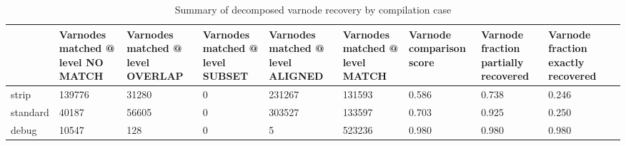 \begin{table}
\centering
\caption{Summary of decomposed varnode recovery by compilation case}
\label{table:opts-varnodes-summary-decomposed}
\begin{tabular}{lp{1.22cm}p{1.22cm}p{1.22cm}p{1.22cm}p{1.22cm}p{1.22cm}p{1.22cm}p{1.22cm}p{1.22cm}}
\toprule
{} &  Varnodes matched @ level NO MATCH &  Varnodes matched @ level OVERLAP &  Varnodes matched @ level SUBSET &  Varnodes matched @ level ALIGNED &  Varnodes matched @ level MATCH &  Varnode comparison score &  Varnode fraction partially recovered &  Varnode fraction exactly recovered \\
\midrule
strip    &                             139776 &                             31280 &                                0 &                            231267 &                          131593 &                     0.586 &                                 0.738 &                               0.246 \\
standard &                              40187 &                             56605 &                                0 &                            303527 &                          133597 &                     0.703 &                                 0.925 &                               0.250 \\
debug    &                              10547 &                               128 &                                0 &                                 5 &                          523236 &                     0.980 &                                 0.980 &                               0.980 \\
\bottomrule
\end{tabular}
\end{table}
